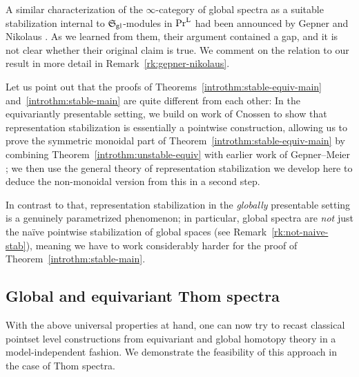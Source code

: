 \documentclass[reqno]{memo-l}
\theoremstyle{mythm}
\theoremstyle{definition}
\numberwithin{equation}{section}
\newcommand{\gl}{\textup{gl}}
\newcommand{\PrL}{\textup{Pr}^{\textup{L}}}
\newcommand{\myS}{{{\mathfrak S\kern-.4pt}}}
\begin{document}
A similar characterization of the $\infty$-category of global spectra as a suitable stabilization internal to $\myS_\gl$-modules in $\PrL$ had been announced by Gepner and Nikolaus \cite{gepner-nikolaus}. As we learned from them, their argument contained a gap, and it is not clear whether their original claim is true. We comment on the relation to our result in more detail in Remark~\ref{rk:gepner-nikolaus}.

Let us point out that the proofs of Theorems~\ref{introthm:stable-equiv-main} and~\ref{introthm:stable-main} are quite different from each other: In the equivariantly presentable setting, we build on work of Cnossen \cite{twisted-ambidexterity} to show that representation stabilization is essentially a pointwise construction, allowing us to prove the symmetric monoidal part of Theorem~\ref{introthm:stable-equiv-main} by combining Theorem~\ref{introthm:unstable-equiv} with earlier work of Gepner--Meier \cite{gepnermeier2020equivTMF}; we then use the general theory of representation stabilization we develop here to deduce the non-monoidal version from this in a second step. 

In contrast to that, representation stabilization in the \emph{globally} presentable setting is a genuinely parametrized phenomenon; in particular, global spectra are \emph{not} just the na\"ive pointwise stabilization of global spaces (see Remark~\ref{rk:not-naive-stab}), meaning we have to work considerably harder for the proof of Theorem~\ref{introthm:stable-main}.
 
\subsection*{Global and equivariant Thom spectra}
With the above universal properties at hand, one can now try to recast classical pointset level constructions from equivariant and global homotopy theory in a model-independent fashion. We demonstrate the feasibility of this approach in the case of Thom spectra.
\end{document}

